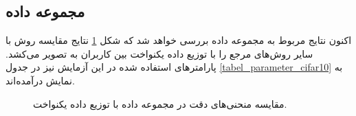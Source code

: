 \FloatBarrier
\subsection{
	مجموعه داده
}
اکنون نتایج مربوط به مجموعه داده
بررسی خواهد شد که شکل
\ref{result_cifar10_equal}
نتایج مقایسه روش
با سایر روش‌های مرجع را با توزیع داده یکنواخت بین کاربران به تصویر می‌کشد.
پارامترهای استفاده شده در این آزمایش نیز در جدول
\ref{tabel_parameter_cifar10}
به نمایش درآمده‌اند.


\begin{figure}[t]
	\centering
	\hspace{0.8mm}
	\caption{
		مقایسه منحنی‌های دقت در مجموعه داده
		با توزیع داده یکنواخت.
	}
	\label{result_cifar10_equal}
\end{figure}


